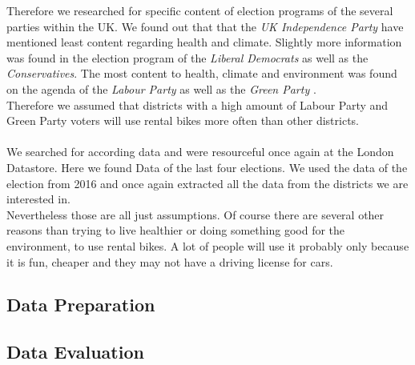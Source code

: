 Therefore we researched for specific content of election programs of the several parties within the UK.
We found out that that the \emph{UK Independence Party} have mentioned least content regarding health and climate. Slightly more information was found in the election program of the \emph{Liberal Democrats} as well as the \emph{Conservatives}. The most content to health, climate and environment was found on the agenda of the \emph{Labour Party} as well as the \emph{Green Party} \cite{SandraLavilleJohnSauven2017}.\\ Therefore we assumed that districts with a high amount of Labour Party and Green Party voters will use rental bikes more often than other districts.\\\\
We searched for according data and were resourceful once again at the London Datastore. Here we found Data of the last four elections. We used the data of the election from 2016 and once again extracted all the data from the districts we are interested in.\\
Nevertheless those are all just assumptions. Of course there are several other reasons than trying to live healthier or doing something good for the environment, to use rental bikes. A lot of people will use it probably only because it is fun, cheaper and they may not have a driving license for cars.  
\subsection{Data Preparation}\label{sec:dpadditional}

\subsection{Data Evaluation}

